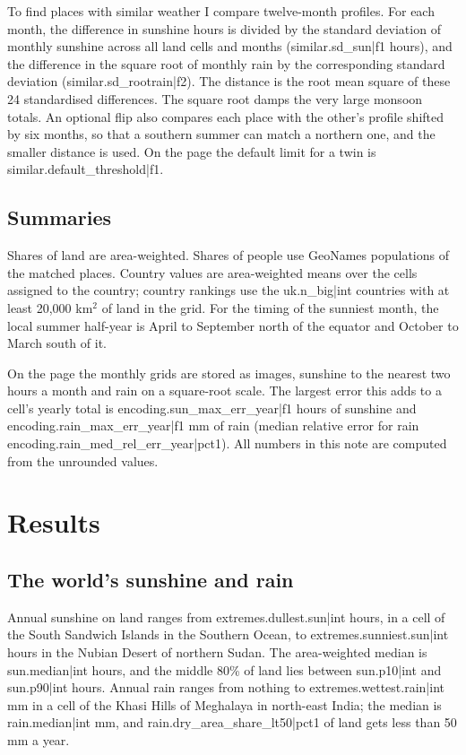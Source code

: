 \documentclass[11pt,a4paper]{article}
\begin{document}
To find places with similar weather I compare twelve-month profiles. For each month, the difference in sunshine hours is divided by the standard deviation of monthly sunshine across all land cells and months ({{similar.sd_sun|f1}} hours), and the difference in the square root of monthly rain by the corresponding standard deviation ({{similar.sd_rootrain|f2}}). The distance is the root mean square of these 24 standardised differences. The square root damps the very large monsoon totals. An optional flip also compares each place with the other's profile shifted by six months, so that a southern summer can match a northern one, and the smaller distance is used. On the page the default limit for a twin is {{similar.default_threshold|f1}}.

\subsection{Summaries}

Shares of land are area-weighted. Shares of people use GeoNames populations of the matched places. Country values are area-weighted means over the cells assigned to the country; country rankings use the {{uk.n_big|int}} countries with at least 20,000 km$^2$ of land in the grid. For the timing of the sunniest month, the local summer half-year is April to September north of the equator and October to March south of it.

On the page the monthly grids are stored as images, sunshine to the nearest two hours a month and rain on a square-root scale. The largest error this adds to a cell's yearly total is {{encoding.sun_max_err_year|f1}} hours of sunshine and {{encoding.rain_max_err_year|f1}} mm of rain (median relative error for rain {{encoding.rain_med_rel_err_year|pct1}}). All numbers in this note are computed from the unrounded values.

\section{Results}

\subsection{The world's sunshine and rain}

Annual sunshine on land ranges from {{extremes.dullest.sun|int}} hours, in a cell of the South Sandwich Islands in the Southern Ocean, to {{extremes.sunniest.sun|int}} hours in the Nubian Desert of northern Sudan. The area-weighted median is {{sun.median|int}} hours, and the middle 80\% of land lies between {{sun.p10|int}} and {{sun.p90|int}} hours. Annual rain ranges from nothing to {{extremes.wettest.rain|int}} mm in a cell of the Khasi Hills of Meghalaya in north-east India; the median is {{rain.median|int}} mm, and {{rain.dry_area_share_lt50|pct1}} of land gets less than 50 mm a year.
\end{document}
